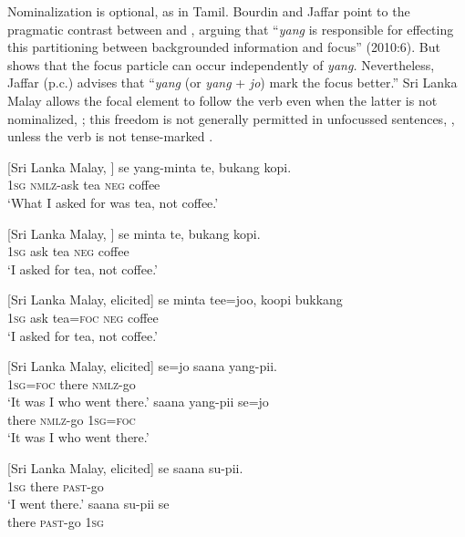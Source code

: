 Nominalization is optional, as in Tamil. Bourdin and Jaffar point to the pragmatic contrast between  and , arguing that ``\textit{yang} is responsible for effecting this partitioning between backgrounded information and focus'' (2010:6). But  shows that the focus particle can occur independently of \textit{yang.} Nevertheless, Jaffar (p.c.) advises that ``\emph{yang} (or \emph{yang} + \emph{jo}) mark the focus better.'' Sri Lanka Malay allows the focal element to follow the verb even when the latter is not nominalized, ; this freedom is not generally permitted in unfocussed sentences, , unless the verb is not tense-marked . 

\ea\label{smith:ex:72}
{}[Sri Lanka Malay, \citet[6]{BourdinEtAl2010}]
\gll se yang-minta te, bukang kopi.\footnotemark{} \\
1\textsc{sg} \textsc{nmlz}-ask tea \textsc{neg} coffee\\
`What I asked for was tea, not coffee.' 
\z
{}


\ea\label{smith:ex:73}
{}[Sri Lanka Malay, \citet[6]{BourdinEtAl2010}]
\gll se minta te, bukang kopi.\footnotemark{} \\
 1\textsc{sg} ask tea \textsc{neg} coffee\\
`I asked for tea, not coffee.' 
\z
{}


\ea\label{smith:ex:74}
{}[Sri Lanka Malay, elicited]
\gll se minta tee=joo, koopi bukkang\\
1\textsc{sg} ask tea=\textsc{foc} \textsc{neg} coffee\\
`I asked for tea, not coffee.' 
\z

\ea\label{smith:ex:75}
{}[Sri Lanka Malay, elicited]
\ea
\gll se=jo saana yang-pii.   \\
 1\textsc{sg}=\textsc{foc} there \textsc{nmlz}-go         \\
`It was I who went there.'
\ex
\gll  saana yang-pii se=jo\\
    there \textsc{nmlz}-go 1\textsc{sg}=\textsc{foc}\\
`It was I who went there.'
\z
\z

\ea\label{smith:ex:76}
{}[Sri Lanka Malay, elicited]
\ea
\gll se saana su-pii.   \\
1\textsc{sg} there \textsc{past}-go \\
`I went there.'
\ex
\gll   *saana su-pii se\\
        there \textsc{past}-go 1\textsc{sg}\\
\z
\z

